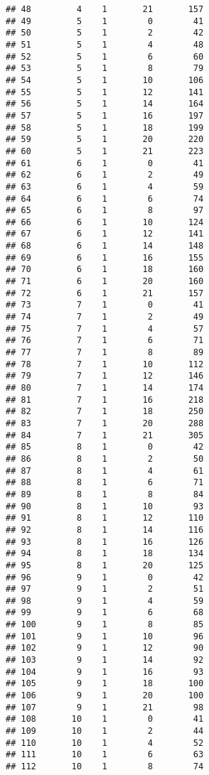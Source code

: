 \documentclass[
]{article}
\begin{document}
\begin{verbatim}
## 48         4    1       21       157
## 49         5    1        0        41
## 50         5    1        2        42
## 51         5    1        4        48
## 52         5    1        6        60
## 53         5    1        8        79
## 54         5    1       10       106
## 55         5    1       12       141
## 56         5    1       14       164
## 57         5    1       16       197
## 58         5    1       18       199
## 59         5    1       20       220
## 60         5    1       21       223
## 61         6    1        0        41
## 62         6    1        2        49
## 63         6    1        4        59
## 64         6    1        6        74
## 65         6    1        8        97
## 66         6    1       10       124
## 67         6    1       12       141
## 68         6    1       14       148
## 69         6    1       16       155
## 70         6    1       18       160
## 71         6    1       20       160
## 72         6    1       21       157
## 73         7    1        0        41
## 74         7    1        2        49
## 75         7    1        4        57
## 76         7    1        6        71
## 77         7    1        8        89
## 78         7    1       10       112
## 79         7    1       12       146
## 80         7    1       14       174
## 81         7    1       16       218
## 82         7    1       18       250
## 83         7    1       20       288
## 84         7    1       21       305
## 85         8    1        0        42
## 86         8    1        2        50
## 87         8    1        4        61
## 88         8    1        6        71
## 89         8    1        8        84
## 90         8    1       10        93
## 91         8    1       12       110
## 92         8    1       14       116
## 93         8    1       16       126
## 94         8    1       18       134
## 95         8    1       20       125
## 96         9    1        0        42
## 97         9    1        2        51
## 98         9    1        4        59
## 99         9    1        6        68
## 100        9    1        8        85
## 101        9    1       10        96
## 102        9    1       12        90
## 103        9    1       14        92
## 104        9    1       16        93
## 105        9    1       18       100
## 106        9    1       20       100
## 107        9    1       21        98
## 108       10    1        0        41
## 109       10    1        2        44
## 110       10    1        4        52
## 111       10    1        6        63
## 112       10    1        8        74

\end{verbatim}
\end{document}
